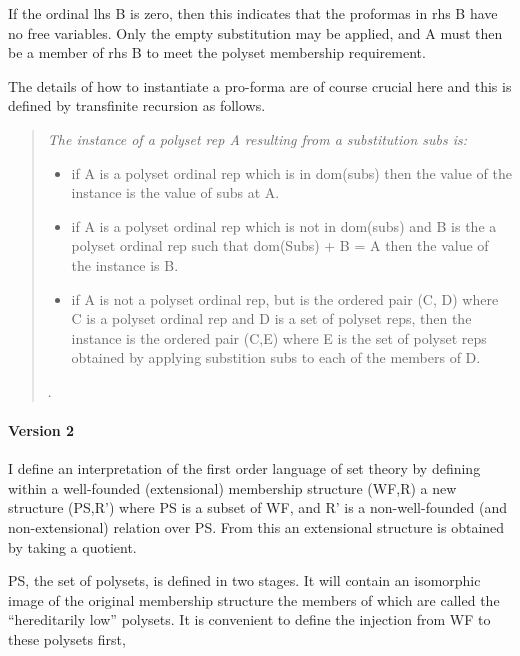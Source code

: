 \documentclass{article}
\begin{document}
\begin{article}
If the ordinal \textsf{lhs B} is zero, then this indicates that the proformas in \textsf{rhs B} have no free variables.
Only the empty substitution may be applied, and \textsf{A} must then be a member of \textsf{rhs B} to meet the polyset membership requirement.

The details of how to instantiate a pro-forma are of course crucial here and this is defined by transfinite recursion as follows.

\begin{quote}
{\it
The instance of a polyset rep \textsf{A} resulting from a substitution \textsf{subs} is:
\begin{itemize}

\item if \textsf{A} is a polyset ordinal rep which is in \textsf{dom(subs)} then the value of the instance is the value of \textsf{subs} at \textsf{A}.

\item if \textsf{A} is a polyset ordinal rep which is not in \textsf{dom(subs)} and \textsf{B} is the a polyset ordinal rep such that \textsf{dom(Subs) + B = A} then the value of the instance is \textsf{B}.

\item if \textsf{A} is not a polyset ordinal rep, but is the ordered pair \textsf{(C, D)} where \textsf{C} is a polyset ordinal rep and \textsf{D} is a set of polyset reps, then the instance is the ordered pair \textsf{(C,E)} where E is the set of polyset reps obtained by applying substition \textsf{subs} to each of the members of \textsf{D}.
\end{itemize}.
}
\end{quote}

\paragraph{Version 2}

I define an interpretation of the first order language of set theory by defining within a well-founded (extensional) membership structure \textsf{(WF,R)} a new structure \textsf{(PS,R')} where \textsf{PS} is a subset of \textsf{WF}, and \textsf{R'} is a non-well-founded (and non-extensional) relation over \textsf{PS}. From this an extensional structure is obtained by taking a quotient.

\textsf{PS}, the set of polysets, is defined in two stages.
It will contain an isomorphic image of the original membership structure the members of which are called the ``hereditarily low'' polysets.
It is convenient to define the injection from \textsf{WF} to these polysets first,


\end{article}
\end{document}
